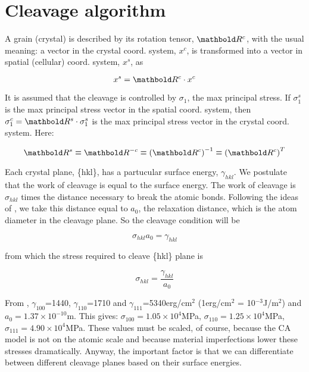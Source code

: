 \section{Cleavage algorithm}

A grain (crystal) is described by its rotation
tensor, $\tenrtwo{R}^c$, with the usual meaning:
a vector in the crystal coord. system, $x^c$,
is transformed into a vector in spatial (cellular) coord. system,
$x^s$, as

\begin{equation}
 x^{s}
  =
   \tenrtwo{R}^{c} \cdot x^{c}
 \label{eq:cgca:pub}
\end{equation}

It is assumed that the cleavage is controlled by
$\sigma_1$, the max principal stress.
If $\sigma_1^s$ is the max principal stress vector
in the spatial coord. system, then
$\sigma_{1}^{c} = \tenrtwo{R}^{s} \cdot \sigma_{1}^{s}$
is the max principal stress vector in the crystal
coord. system.
Here:

\begin{equation}
 \tenrtwo{R}^{s}
 \equiv
 \tenrtwo{R}^{-c}
  \equiv
   \left (
           \tenrtwo{R}^{c}
   \right)^{-1}
    \equiv
     \left (
             \tenrtwo{R}^{c}
     \right)^{T}
\label{eq:cgca:wonk}
\end{equation}

Each crystal plane, \{hkl\}, has a partucular
surface energy, $\gamma_{hkl}$.
We postulate that the work of cleavage
is equal to the surface energy.
The work of cleavage is $\sigma_{hkl}$ times the distance necessary
to break the atomic bonds.
Following the ideas of \cite{gilman1959},
we take this distance equal to $a_0$, the
relaxation distance, which is the atom
diameter in the cleavage plane.
So the cleavage condition will be

\begin{equation}
 \sigma_{hkl}
   a_0
    =
     \gamma_{hkl}
\label{eq:cleav}
\end{equation}

from which the stress required to
cleave \{hkl\} plane is

\begin{equation}
 \sigma_{hkl}
  =
   \frac{ \gamma_{hkl}} { a_0}
\label{eq:muk}
\end{equation}

From \cite{gilman1959}, $\gamma_{100}$=1440,
$\gamma_{110}$=1710 and $\gamma_{111}$=5340erg/cm$^2$
(1erg/cm$^2$ = 10$^{-3}$J/m$^2$) and
$a_0=1.37 \times 10^{-10}$m.
This gives:
$\sigma_{100}=1.05 \times 10^4$MPa,
$\sigma_{110}=1.25 \times 10^4$MPa,
$\sigma_{111}=4.90 \times 10^4$MPa.
These values must be scaled, of course, because
the CA model is not on the atomic scale and because
material imperfections lower these stresses dramatically.
Anyway, the important factor is that we can differentiate
between different cleavage planes based on their
surface energies.

